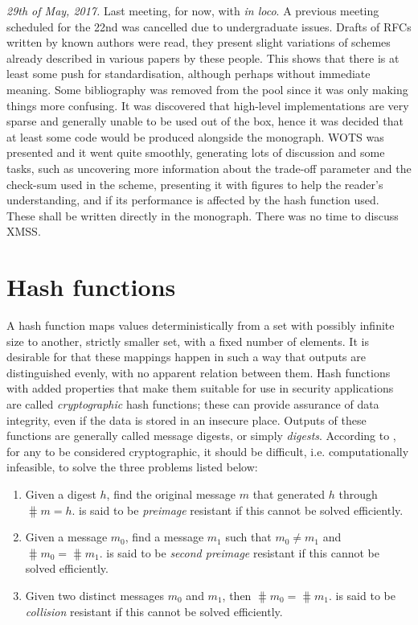 \documentclass{article}
\begin{document}
\emph{29th of May, 2017.} Last meeting, for now, with \dan{} \emph{in loco}. A
previous meeting scheduled for the 22nd was cancelled due to undergraduate
issues. Drafts of RFCs written by known authors were read, they present slight
variations of schemes already described in various papers by these people.
This shows that there is at least some push for standardisation, although
perhaps without immediate meaning. Some bibliography was removed from the pool
since it was only making things more confusing. It was discovered that
high-level implementations are very sparse and generally unable to be used out
of the box, hence it was decided that at least some code would be produced
alongside the monograph. WOTS was presented and it went quite smoothly,
generating lots of discussion and some tasks, such as uncovering more
information about the trade-off parameter and the check-sum used in the scheme,
presenting it with figures to help the reader's understanding, and if its
performance is affected by the hash function used. These shall be written
directly in the monograph. There was no time to discuss XMSS.

\section*{Hash functions}

A hash function \hh{} maps values deterministically from a set with possibly
infinite size to another, strictly smaller set, with a fixed number of
elements. It is desirable for \hh{} that these mappings happen in such a way
that outputs are distinguished evenly, with no apparent relation between them.
Hash functions with added properties that make them suitable for use in
security applications are called \emph{cryptographic} hash functions;
these can provide assurance of data integrity, even if the data is stored
in an insecure place. Outputs of these functions are generally called
message digests, or simply \emph{digests}. According to
\cite{stinson2005cryptography}, for any \hh{} to be considered
cryptographic, it should be difficult, i.e. computationally infeasible,
to solve the three problems listed below:

\begin{enumerate}[label=\roman*.]
    \item Given a digest $h$, find the original
    message $m$ that generated $h$ through $\hash{m} = h$.
    \hh{} is said to be \emph{preimage} resistant if this cannot be solved efficiently.
    \item Given a message $m_0$, find a message
    $m_1$ such that $m_0 \neq m_1$ and $\hash{m_0} = \hash{m_1}$.
    \hh{} is said to be \emph{second preimage} resistant if this cannot
    be solved efficiently.
    \item Given two distinct messages $m_0$ and $m_1$, then $\hash{m_0} = \hash{m_1}$.
    \hh{} is said to be \emph{collision} resistant if this cannot be
    solved efficiently.
\end{enumerate}
\end{document}
